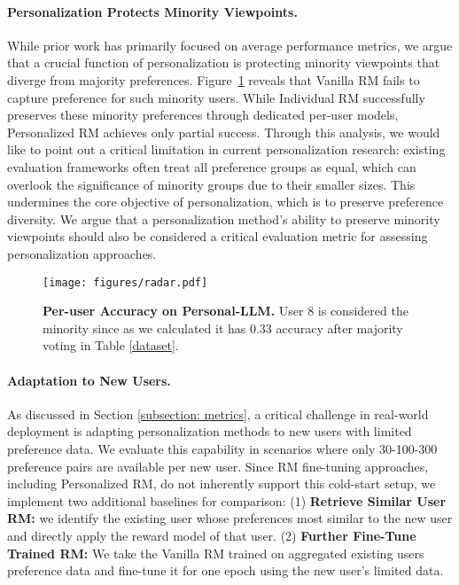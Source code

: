 \paragraph{Personalization Protects Minority Viewpoints.} 
While prior work has primarily focused on average performance metrics, we argue that a crucial function of personalization is protecting minority viewpoints that diverge from majority preferences. 
Figure~\ref{radar} reveals that Vanilla RM fails to capture preference for such minority users.
While Individual RM successfully preserves these minority preferences through dedicated per-user models, Personalized RM achieves only partial success.
Through this analysis, we would like to point out a critical limitation in current personalization research: existing evaluation frameworks often treat all preference groups as equal, which can overlook the significance of minority groups due to their smaller sizes. This undermines the core objective of personalization, which is to preserve preference diversity.
We argue that a personalization method's ability to preserve minority viewpoints should also be considered a critical evaluation metric for assessing personalization approaches.


\begin{figure}[]
\centering
\vspace{-0.2cm}
\texttt{[image: figures/radar.pdf]}
\vspace{-0.2cm}
\caption{\textbf{Per-user Accuracy on Personal-LLM.} User 8 is considered the minority since as we calculated it has 0.33 accuracy after majority voting in Table \ref{dataset}.}
\label{radar}
\vspace{-0.5cm}
\end{figure}


\paragraph{Adaptation to New Users.} 
As discussed in Section \ref{subsection: metrics}, a critical challenge in real-world deployment is adapting personalization methods to new users with limited preference data. We evaluate this capability in scenarios where only 30-100-300 preference pairs are available per new user. Since RM fine-tuning approaches, including Personalized RM, do not inherently support this cold-start setup, we implement two additional baselines for comparison:
(1) \textbf{Retrieve Similar User RM:} we identify the existing user whose preferences most similar to the new user and directly apply the reward model of that user. (2) \textbf{Further Fine-Tune Trained RM:} We take the Vanilla RM trained on aggregated existing users preference data and fine-tune it for one epoch using the new user’s limited data.


